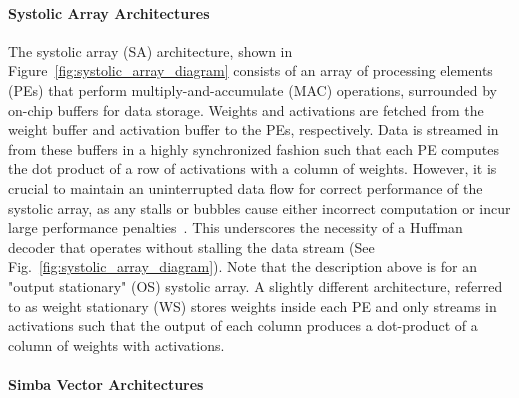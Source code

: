 \paragraph{Systolic Array Architectures} %
The systolic array (SA) architecture, shown in Figure~\ref{fig:systolic_array_diagram} consists of an array of processing elements (PEs) that perform multiply-and-accumulate (MAC)
operations, 
surrounded by on-chip buffers for data storage. Weights and activations are fetched from the weight buffer and activation buffer to the PEs, respectively. 
Data is streamed in from these buffers in a 
highly synchronized fashion such that each PE 
computes the dot product of a row of activations with a column of weights. 
However, 
it is crucial to maintain an uninterrupted data flow for correct performance of the systolic array, as
any stalls or bubbles cause either incorrect computation or incur large performance penalties~\cite{sa-pipeline}.
This underscores the necessity of a Huffman decoder that operates without stalling the data stream (See Fig.~\ref{fig:systolic_array_diagram}). 
Note that the description above is for an "output stationary" (OS) systolic array. A slightly different architecture, referred to as weight stationary (WS) stores weights inside each PE and only streams in activations such that the output of each column produces a dot-product of a column of weights with activations. 


\paragraph{Simba Vector Architectures} %

